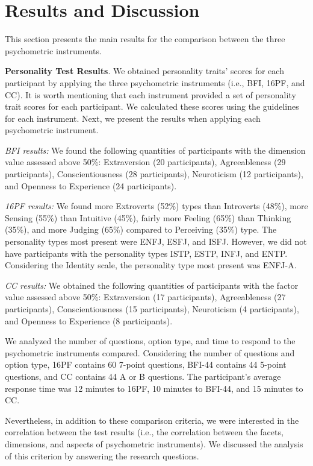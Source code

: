 \section{Results and Discussion}
\label{Results and Discussion}

This section presents the main results for the comparison between the three psychometric instruments. 

\textbf{Personality Test Results}. We obtained personality traits’ scores for each participant by applying the three psychometric instruments (i.e., BFI, 16PF, and CC). It is worth mentioning that each instrument provided a set of personality trait scores for each participant. We calculated these scores using the guidelines for each instrument. Next, we present the results when applying each psychometric instrument.

\textit{BFI results:} We found the following quantities of participants with the dimension value assessed above 50\%: Extraversion (20 participants), Agreeableness (29 participants), Conscientiousness (28 participants), Neuroticism (12 participants), and Openness to Experience (24 participants). 

\textit{16PF results:} We found more Extroverts (52\%) types than Introverts (48\%), more Sensing (55\%) than Intuitive (45\%), fairly more Feeling (65\%) than Thinking (35\%), and more Judging (65\%) compared to Perceiving (35\%) type. The personality types most present were ENFJ, ESFJ, and ISFJ. However, we did not have participants with the personality types ISTP, ESTP, INFJ, and ENTP. Considering the Identity scale, the personality type most present was ENFJ-A.

\textit{CC results:} We obtained the following quantities of participants with the factor value assessed above 50\%: Extraversion (17 participants), Agreeableness (27 participants), Conscientiousness (15 participants), Neuroticism (4 participants), and Openness to Experience (8 participants). 

We analyzed the number of questions, option type, and time to respond to the psychometric instruments compared. Considering the number of questions and option type, 16PF contains 60 7-point questions, BFI-44 contains 44 5-point questions, and CC contains 44 A or B questions. The participant's average response time was 12 minutes to 16PF, 10 minutes to BFI-44, and 15 minutes to CC. 

Nevertheless, in addition to these comparison criteria, we were interested in the correlation between the test results (i.e., the correlation between the facets, dimensions, and aspects of psychometric instruments). We discussed the analysis of this criterion by answering the research questions.

